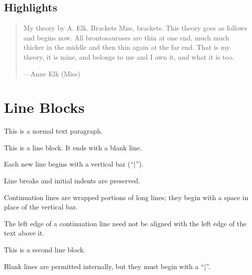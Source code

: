 \documentclass[a4paper,10pt,english]{sphinxmanual}
\begin{document}
\subsection{Highlights}
\label{\detokenize{test1:highlights}}
\sphinxAtStartPar
{}
\begin{quote}

\sphinxAtStartPar
My theory by A. Elk.  Brackets Miss, brackets.  This theory goes
as follows and begins now.  All brontosauruses are thin at one
end, much much thicker in the middle and then thin again at the
far end.  That is my theory, it is mine, and belongs to me and I
own it, and what it is too.

\begin{flushright}
---Anne Elk (Miss)
\end{flushright}
\end{quote}


\section{Line Blocks}
\label{\detokenize{test1:line-blocks}}
\sphinxAtStartPar
{}

\sphinxAtStartPar
This is a normal text paragraph.

\begin{DUlineblock}{0em}
\item[] This is a line block.  It ends with a blank line.
\item[]
\begin{DUlineblock}{\DUlineblockindent}
\item[] Each new line begins with a vertical bar (“|”).
\item[] Line breaks and initial indents are preserved.
\end{DUlineblock}
\item[] Continuation lines are wrapped portions of long lines;
they begin with a space in place of the vertical bar.
\item[]
\begin{DUlineblock}{\DUlineblockindent}
\item[] The left edge of a continuation line need not be aligned with
the left edge of the text above it.
\end{DUlineblock}
\end{DUlineblock}

\begin{DUlineblock}{0em}
\item[] This is a second line block.
\item[] 
\item[] Blank lines are permitted internally, but they must begin with a “|”.
\end{DUlineblock}
\end{document}
